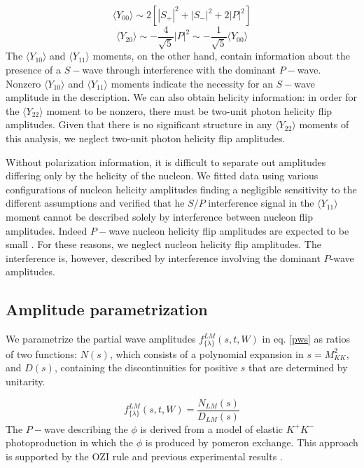 \documentclass[twocolumn,superscriptaddress,prd]{revtex4}
\begin{document}
\begin{equation} 
\langle Y_{00}   \rangle \sim  2[ |S_+|^2 + |S_-|^2 + 2 |P|^2 ] 
\end{equation} 
\begin{equation} 
\langle Y_{20}  \rangle \sim -\frac{4}{\sqrt{5}} |P|^2 \sim - \frac{1}{\sqrt{5}} \langle Y_{00} \rangle
\end{equation} 
 The $\langle Y_{10} \rangle$ and $\langle Y_{11} \rangle$ moments, on the other hand, contain information about the presence of a $S-$wave through interference with the dominant $P-$wave. Nonzero $\langle Y_{10} \rangle$ and $\langle Y_{11} \rangle$ moments indicate the necessity for an $S-$wave amplitude in the description. We can also obtain helicity information: in order for the $\langle Y_{22} \rangle$ moment to be nonzero, there must be two-unit photon helicity flip amplitudes. Given that there is no significant structure in any $\langle Y_{22} \rangle$ moments of this analysis, we neglect two-unit photon helicity flip amplitudes.
 
Without polarization information, it is difficult to separate out amplitudes differing only by the helicity of the nucleon.
We fitted data using  various configurations of nucleon helicity amplitudes finding a negligible sensitivity to the different assumptions and verified that he $S/P$ interference signal in the $\langle Y_{11} \rangle$ moment cannot be described solely by interference between nucleon flip amplitudes. Indeed $P-$wave nucleon helicity flip amplitudes are expected to be small \cite{??}. For these reasons, we neglect nucleon helicity flip amplitudes. 
The interference is, however, described by interference involving the dominant $P$-wave amplitudes. \


\subsection{Amplitude parametrization} 
\label{anal}

 We parametrize the partial wave amplitudes $f^{LM}_{\{\lambda\}}(s,t,W)$ in eq. \ref{pws} as ratios of two functions: $N(s)$, which consists of a polynomial expansion in $s = M_{KK}^2$, and $D(s)$, containing the discontinuities for positive $s$ that are determined by unitarity.

\begin{equation} 
f^{LM}_{\{\lambda\}}(s,t,W)  = \frac{N_{LM}(s)}{D_{LM}(s)}
 \end{equation}
 The $P-$wave describing the $\phi$ is derived from a model of elastic $K^+K^-$ photoproduction in which the $\phi$ is produced by pomeron exchange. This approach is supported by the OZI rule and previous experimental results  \cite{Lesniak:2005}.
\end{document}
